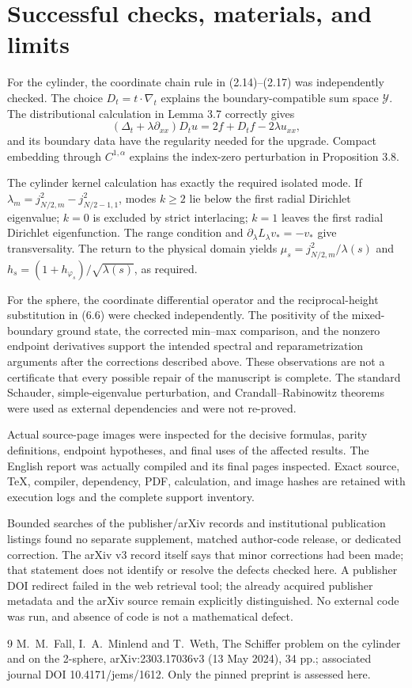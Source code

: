 \documentclass[10pt]{article}
\begin{document}
\section*{Successful checks, materials, and limits}
For the cylinder, the coordinate chain rule in (2.14)–(2.17) was independently checked. The choice \(D_t=t\cdot\nabla_t\) explains the boundary-compatible sum space \(\mathcal Y\). The distributional calculation in Lemma 3.7 correctly gives \[(\Delta_t+\lambda\partial_{xx})D_tu
 =2f+D_tf-2\lambda u_{xx},\] and its boundary data have the regularity needed for the upgrade. Compact embedding through \(C^{1,\alpha}\) explains the index-zero perturbation in Proposition 3.8.\par
The cylinder kernel calculation has exactly the required isolated mode. If \(\lambda_m=j_{N/2,m}^2-j_{N/2-1,1}^2\), modes \(k\ge2\) lie below the first radial Dirichlet eigenvalue; \(k=0\) is excluded by strict interlacing; \(k=1\) leaves the first radial Dirichlet eigenfunction. The range condition and \(\partial_\lambda L_\lambda v_*=-v_*\) give transversality. The return to the physical domain yields \(\mu_s=j_{N/2,m}^2/\lambda(s)\) and \(h_s=(1+h_{\varphi_s})/\sqrt{\lambda(s)}\), as required.\par
For the sphere, the coordinate differential operator and the reciprocal-height substitution in (6.6) were checked independently. The positivity of the mixed-boundary ground state, the corrected min–max comparison, and the nonzero endpoint derivatives support the intended spectral and reparametrization arguments after the corrections described above. These observations are not a certificate that every possible repair of the manuscript is complete. The standard Schauder, simple-eigenvalue perturbation, and Crandall–Rabinowitz theorems were used as external dependencies and were not re-proved.\par
Actual source-page images were inspected for the decisive formulas, parity definitions, endpoint hypotheses, and final uses of the affected results. The English report was actually compiled and its final pages inspected. Exact source, TeX, compiler, dependency, PDF, calculation, and image hashes are retained with execution logs and the complete support inventory.\par
Bounded searches of the publisher/arXiv records and institutional publication listings found no separate supplement, matched author-code release, or dedicated correction. The arXiv v3 record itself says that minor corrections had been made; that statement does not identify or resolve the defects checked here. A publisher DOI redirect failed in the web retrieval tool; the already acquired publisher metadata and the arXiv source remain explicitly distinguished. No external code was run, and absence of code is not a mathematical defect.\par
9 M. M. Fall, I. A. Minlend and T. Weth, The Schiffer problem on the cylinder and on the 2-sphere, arXiv:2303.17036v3 (13 May 2024), 34 pp.; associated journal DOI 10.4171/jems/1612. Only the pinned preprint is assessed here.\par
\end{document}
